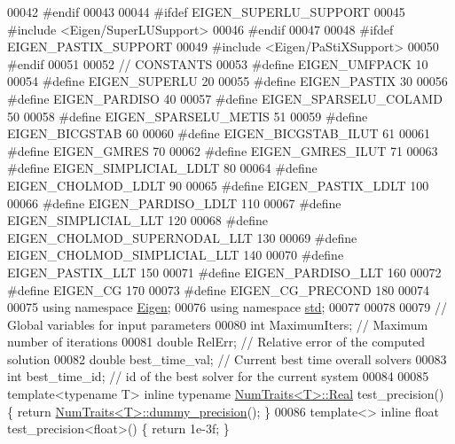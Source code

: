 \begin{DoxyCode}
00042 \textcolor{preprocessor}{#endif}
00043 
00044 \textcolor{preprocessor}{#ifdef EIGEN\_SUPERLU\_SUPPORT}
00045 \textcolor{preprocessor}{#include <Eigen/SuperLUSupport>}
00046 \textcolor{preprocessor}{#endif}
00047 
00048 \textcolor{preprocessor}{#ifdef EIGEN\_PASTIX\_SUPPORT}
00049 \textcolor{preprocessor}{#include <Eigen/PaStiXSupport>}
00050 \textcolor{preprocessor}{#endif}
00051 
00052 \textcolor{comment}{// CONSTANTS}
00053 \textcolor{preprocessor}{#define EIGEN\_UMFPACK  10}
00054 \textcolor{preprocessor}{#define EIGEN\_SUPERLU  20}
00055 \textcolor{preprocessor}{#define EIGEN\_PASTIX  30}
00056 \textcolor{preprocessor}{#define EIGEN\_PARDISO  40}
00057 \textcolor{preprocessor}{#define EIGEN\_SPARSELU\_COLAMD 50}
00058 \textcolor{preprocessor}{#define EIGEN\_SPARSELU\_METIS 51}
00059 \textcolor{preprocessor}{#define EIGEN\_BICGSTAB  60}
00060 \textcolor{preprocessor}{#define EIGEN\_BICGSTAB\_ILUT  61}
00061 \textcolor{preprocessor}{#define EIGEN\_GMRES 70}
00062 \textcolor{preprocessor}{#define EIGEN\_GMRES\_ILUT 71}
00063 \textcolor{preprocessor}{#define EIGEN\_SIMPLICIAL\_LDLT  80}
00064 \textcolor{preprocessor}{#define EIGEN\_CHOLMOD\_LDLT  90}
00065 \textcolor{preprocessor}{#define EIGEN\_PASTIX\_LDLT  100}
00066 \textcolor{preprocessor}{#define EIGEN\_PARDISO\_LDLT  110}
00067 \textcolor{preprocessor}{#define EIGEN\_SIMPLICIAL\_LLT  120}
00068 \textcolor{preprocessor}{#define EIGEN\_CHOLMOD\_SUPERNODAL\_LLT  130}
00069 \textcolor{preprocessor}{#define EIGEN\_CHOLMOD\_SIMPLICIAL\_LLT  140}
00070 \textcolor{preprocessor}{#define EIGEN\_PASTIX\_LLT  150}
00071 \textcolor{preprocessor}{#define EIGEN\_PARDISO\_LLT  160}
00072 \textcolor{preprocessor}{#define EIGEN\_CG  170}
00073 \textcolor{preprocessor}{#define EIGEN\_CG\_PRECOND  180}
00074 
00075 \textcolor{keyword}{using namespace }\hyperlink{namespace_eigen}{Eigen};
00076 \textcolor{keyword}{using namespace }\hyperlink{namespacestd}{std}; 
00077 
00078 
00079 \textcolor{comment}{// Global variables for input parameters}
00080 \textcolor{keywordtype}{int} MaximumIters; \textcolor{comment}{// Maximum number of iterations}
00081 \textcolor{keywordtype}{double} RelErr; \textcolor{comment}{// Relative error of the computed solution}
00082 \textcolor{keywordtype}{double} best\_time\_val; \textcolor{comment}{// Current best time overall solvers }
00083 \textcolor{keywordtype}{int} best\_time\_id; \textcolor{comment}{//  id of the best solver for the current system }
00084 
00085 \textcolor{keyword}{template}<\textcolor{keyword}{typename} T> \textcolor{keyword}{inline} \textcolor{keyword}{typename} \hyperlink{group___core___module_struct_eigen_1_1_num_traits}{NumTraits<T>::Real} test\_precision() \{ \textcolor{keywordflow}{return} 
      \hyperlink{group___core___module_struct_eigen_1_1_num_traits}{NumTraits<T>::dummy\_precision}(); \}
00086 \textcolor{keyword}{template}<> \textcolor{keyword}{inline} \textcolor{keywordtype}{float} test\_precision<float>() \{ \textcolor{keywordflow}{return} 1e-3f; \}                                          
                         

\end{DoxyCode}

